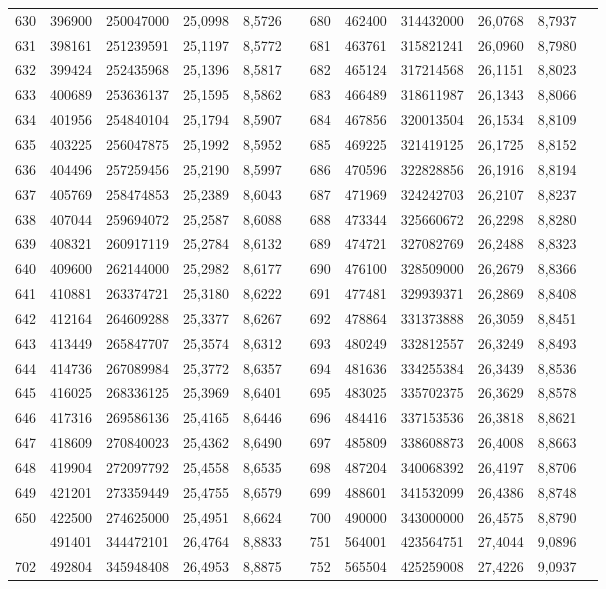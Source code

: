\begin{longtable}{p{.17\linewidth}*{11}{S}}
630&396900&250047000&25,0998&8,5726&&680&462400&314432000&26,0768&8,7937\\
631&398161&251239591&25,1197&8,5772&&681&463761&315821241&26,0960&8,7980\\
632&399424&252435968&25,1396&8,5817&&682&465124&317214568&26,1151&8,8023\\
633&400689&253636137&25,1595&8,5862&&683&466489&318611987&26,1343&8,8066\\
634&401956&254840104&25,1794&8,5907&&684&467856&320013504&26,1534&8,8109\\
635&403225&256047875&25,1992&8,5952&&685&469225&321419125&26,1725&8,8152\\
636&404496&257259456&25,2190&8,5997&&686&470596&322828856&26,1916&8,8194\\
637&405769&258474853&25,2389&8,6043&&687&471969&324242703&26,2107&8,8237\\
638&407044&259694072&25,2587&8,6088&&688&473344&325660672&26,2298&8,8280\\
639&408321&260917119&25,2784&8,6132&&689&474721&327082769&26,2488&8,8323\\
640&409600&262144000&25,2982&8,6177&&690&476100&328509000&26,2679&8,8366\\
641&410881&263374721&25,3180&8,6222&&691&477481&329939371&26,2869&8,8408\\
642&412164&264609288&25,3377&8,6267&&692&478864&331373888&26,3059&8,8451\\
643&413449&265847707&25,3574&8,6312&&693&480249&332812557&26,3249&8,8493\\
644&414736&267089984&25,3772&8,6357&&694&481636&334255384&26,3439&8,8536\\
645&416025&268336125&25,3969&8,6401&&695&483025&335702375&26,3629&8,8578\\
646&417316&269586136&25,4165&8,6446&&696&484416&337153536&26,3818&8,8621\\
647&418609&270840023&25,4362&8,6490&&697&485809&338608873&26,4008&8,8663\\
648&419904&272097792&25,4558&8,6535&&698&487204&340068392&26,4197&8,8706\\
649&421201&273359449&25,4755&8,6579&&699&488601&341532099&26,4386&8,8748\\
650&422500&274625000&25,4951&8,6624&&700&490000&343000000&26,4575&8,8790\\
&491401&344472101&26,4764&8,8833&&751&564001&423564751&27,4044&9,0896\\
702&492804&345948408&26,4953&8,8875&&752&565504&425259008&27,4226&9,0937\\

\end{longtable}
